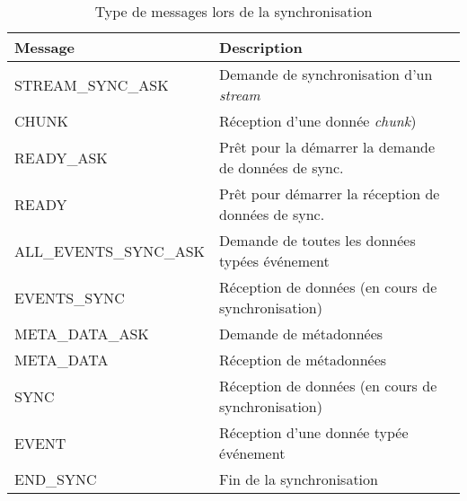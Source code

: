 \begin{appendix}
\begin{table}[h]
	\centering
	\small
	\caption{Type de messages lors de la synchronisation}
	\label{table:messagetype}
	\begin{tabular}{ll}
		\toprule
		\textbf{Message}                & \textbf{Description} \\ \hline
		STREAM\_SYNC\_ASK      &  Demande de synchronisation d'un 
		\textit{stream}           \\
		CHUNK                  &     Réception d'une donnée \textit{chunk})        
		\\
		READY\_ASK             &      Prêt pour la démarrer la demande de 
		données de 
		sync.        \\
		READY                  &       Prêt pour démarrer la réception de 
		données de 
		sync.      \\
		ALL\_EVENTS\_SYNC\_ASK &     Demande de toutes les données 
		typées 
		événement           \\
		EVENTS\_SYNC           &        Réception de données (en cours de 
		synchronisation)       \\
		META\_DATA\_ASK        &     Demande de métadonnées       \\
		META\_DATA             &      Réception de métadonnées       \\
		SYNC                   &      Réception de données (en cours de 
		synchronisation)         \\
		EVENT                  &     Réception d'une donnée typée 
		événement        \\
		END\_SYNC              & Fin de la synchronisation \\ \bottomrule
	\end{tabular}
\end{table}


\end{appendix}
